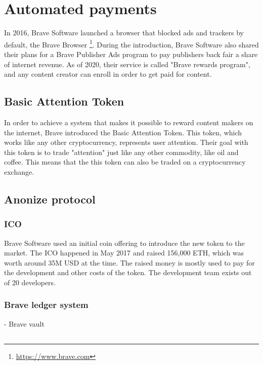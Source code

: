 \section{Automated payments}
In 2016, Brave Software launched a browser that blocked ads and trackers by default, the Brave Browser \footnote{\url{https://www.brave.com}}. During the introduction, Brave Software also shared their plans for a Brave Publisher Ads program to pay publishers back fair a share of internet revenue. As of 2020, their service is called "Brave rewards program", and any content creator can enroll in order to get paid for content. 

\subsection{Basic Attention Token} 
In order to achieve a system that makes it possible to reward content makers on the internet, Brave introduced the Basic Attention Token. This token, which works like any other cryptocurrency, represents user attention. Their goal with this token is to trade "attention" just like any other commodity, like oil and coffee. This means that the this token can also be traded on a cryptocurrency exchange. 

\subsection{Anonize protocol}


\subsubsection{ICO}
Brave Software used an initial coin offering to introduce the new token to the market. The ICO happened in May 2017 and raised 156,000 ETH, which was worth around 35M USD at the time. The raised money is mostly used to pay for the development and other costs of the token. The development team exists out of 20 developers.

\subsubsection{Brave ledger system}

- Brave vault

\subsection{}




